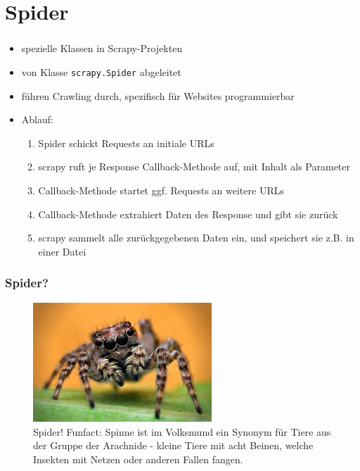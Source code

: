 \documentclass{beamer}
\begin{document}
\section{Spider}
\begin{frame}[fragile]
	\frametitle{\insertsection}
	\begin{itemize}
		\item spezielle Klassen in Scrapy-Projekten
		\item von Klasse \verb|scrapy.Spider| abgeleitet
		\item führen Crawling durch, spezifisch für Websites programmierbar
		\item Ablauf: \begin{enumerate}		
			\item Spider schickt Requests an initiale URLs
			\item scrapy ruft je Response Callback-Methode auf, mit Inhalt als Parameter
			\item Callback-Methode startet ggf. Requests an weitere URLs
			\item Callback-Methode extrahiert Daten des Response und gibt sie zurück
			\item scrapy sammelt alle zurückgegebenen Daten ein, und speichert sie z.B. in einer Datei
		\end{enumerate}
	\end{itemize}
\end{frame}

\begin{frame}[fragile]
	\frametitle{Spider?}	
	\begin{figure}
		\begin{center}
			\includegraphics[width=0.6\textwidth]{texsrc/Spider_cute}
		\end{center}
		\caption{Spider! Funfact: Spinne ist im Volksmund ein Synonym für Tiere aus
		der Gruppe der Arachnide - kleine Tiere mit acht Beinen, welche Insekten mit Netzen oder
		anderen Fallen fangen.}
		\label{fig:Spider}
	\end{figure}
\end{frame}
\end{document}
